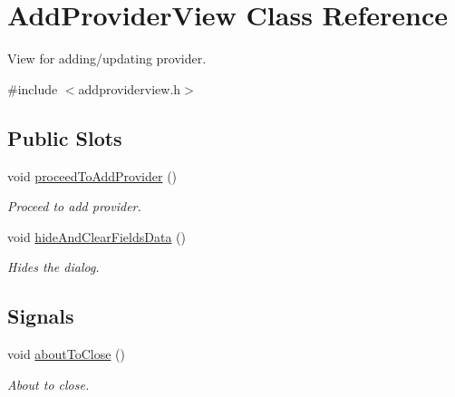 \hypertarget{class_add_provider_view}{\section{\-Add\-Provider\-View \-Class \-Reference}
\label{class_add_provider_view}
}


\-View for adding/updating provider.  




{\ttfamily \#include $<$addproviderview.\-h$>$}

\subsection*{\-Public \-Slots}
\begin{DoxyCompactItemize}
\item 
void \hyperlink{class_add_provider_view_afea017ff56cf84dad22746776ed61543}{proceed\-To\-Add\-Provider} ()
\begin{DoxyCompactList}\small\item\em \-Proceed to add provider. \end{DoxyCompactList}\item 
void \hyperlink{class_add_provider_view_acb21d94568814fa40a7fd9f2d3b9cddb}{hide\-And\-Clear\-Fields\-Data} ()
\begin{DoxyCompactList}\small\item\em \-Hides the dialog. \end{DoxyCompactList}\end{DoxyCompactItemize}
\subsection*{\-Signals}
\begin{DoxyCompactItemize}
\item 
void \hyperlink{class_add_provider_view_a699c67594c18d59ccbf83890d91840a8}{about\-To\-Close} ()
\begin{DoxyCompactList}\small\item\em \-About to close. \end{DoxyCompactList}\end{DoxyCompactItemize}
